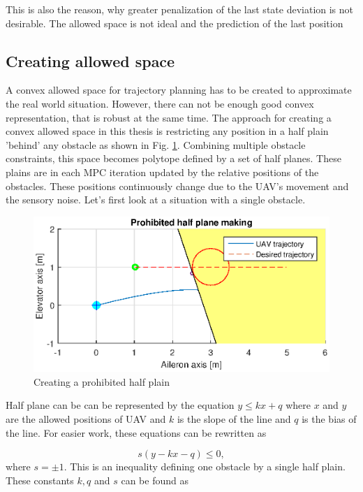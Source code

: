 \documentclass[a4paper,11pt,titlepage]{article}
\begin{document}
This is also the reason, why greater penalization of the last state deviation is not desirable. The allowed space is not ideal and the prediction of the last position 

\subsection{Creating allowed space}


A convex allowed space for trajectory planning has to be created to approximate the real world situation. However, there can not be enough good convex representation, that is robust at the same time. The approach for creating a convex allowed space in this thesis is restricting any position in a half plain 'behind' any obstacle as shown in Fig. \ref{fig:half_plain}. Combining multiple obstacle constraints, this space becomes polytope defined by a set of half planes. These plains are in each MPC iteration updated by the relative positions of the obstacles. These positions continuously change due to the UAV's movement and the sensory noise. Let's first look at a situation with a single obstacle. 

\begin{figure}[h]
\centering
\includegraphics[width=1\textwidth]{fig/half_plain_making.eps} 
\caption{Creating a prohibited half plain}
\label{fig:half_plain}
\end{figure}

Half plane can be can be represented by the equation $y \leq kx + q$  where $x$ and $y$ are the allowed positions of UAV and $k$ is the slope of the line and $q$ is the bias of the line. For easier work, these equations can be rewritten as

\begin{equation}
\label{eq:simple_obstacle_cond}
s(y - kx - q) \leq 0,
\end{equation}
where $s = \pm 1$. This is an inequality defining one obstacle by a single half plain. 
These constants $k, q$ and $s$ can be found as 
\end{document}
